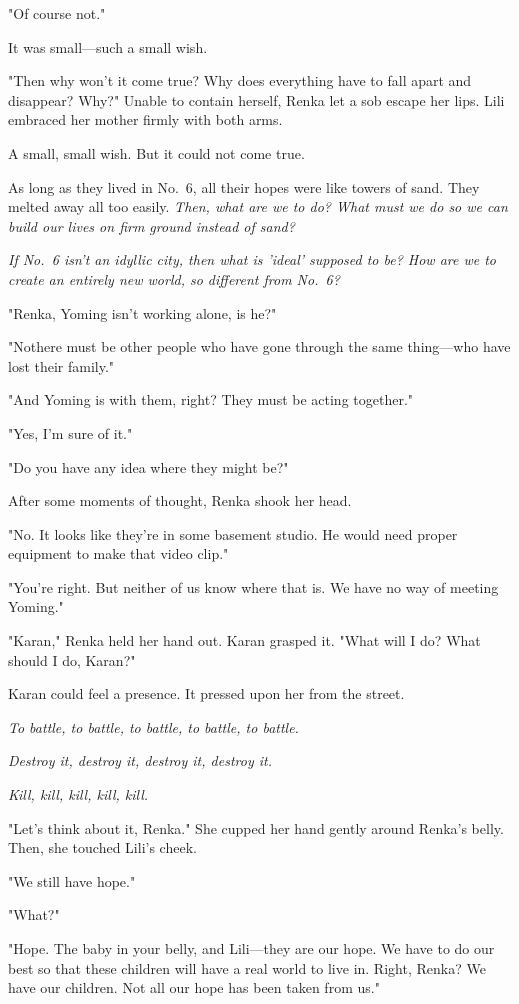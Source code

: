 "Of course not."

It was small---such a small wish.

"Then why won't it come true? Why does everything have to fall apart and
disappear? Why?" Unable to contain herself, Renka let a sob escape her
lips. Lili embraced her mother firmly with both arms.

A small, small wish. But it could not come true.

As long as they lived in No.~6, all their hopes were like towers of
sand. They melted away all too easily. \emph{Then, what are we to do? What
must we do so we can build our lives on firm ground instead of sand?}

\emph{If No.~6 isn't an idyllic city, then what is 'ideal' supposed to be? How
are we to create an entirely new world, so different from No.~6?}

"Renka, Yoming isn't working alone, is he?"

"No\el there must be other people who have gone through the same
thing---who have lost their family."

"And Yoming is with them, right? They must be acting together."

"Yes, I'm sure of it."

"Do you have any idea where they might be?"

After some moments of thought, Renka shook her head.

"No. It looks like they're in some basement studio. He would need proper
equipment to make that video clip."

"You're right. But neither of us know where that is. We have no way of
meeting Yoming."

"Karan," Renka held her hand out. Karan grasped it. "What will I do?
What should I do, Karan?"

Karan could feel a presence. It pressed upon her from the street.

\emph{To battle, to battle, to battle, to battle, to battle.}

\emph{Destroy it, destroy it, destroy it, destroy it.}

\emph{Kill, kill, kill, kill, kill.}

"Let's think about it, Renka." She cupped her hand gently around Renka's
belly. Then, she touched Lili's cheek.

"We still have hope."

"What?"

"Hope. The baby in your belly, and Lili---they are our hope. We have to do
our best so that these children will have a real world to live in.
Right, Renka? We have our children. Not all our hope has been taken from
us."

